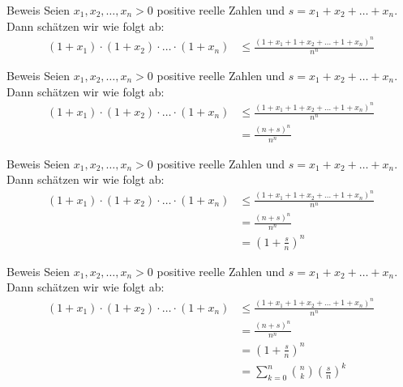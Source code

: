 \documentclass[10pt]{beamer}
\begin{document}
\begin{frame}{Beweis}
    Seien \( x_{1}, x_{2}, \ldots, x_{n} > 0 \) positive reelle Zahlen und \( s = x_{1} + x_{2} + \ldots + x_{n} \). Dann schätzen wir wie folgt ab:
    \begin{align*}
         \left( 1 + x_{1} \right) \cdot \left( 1 + x_{2} \right) \cdot \ldots \cdot \left( 1 + x_{n} \right)
         & \leq \frac{\left( 1 + x_{1} + 1 + x_{2} + \ldots + 1 + x_{n} \right)^{n}}{n^{n}}
    \end{align*}
\end{frame}



\begin{frame}{Beweis}
    Seien \( x_{1}, x_{2}, \ldots, x_{n} > 0 \) positive reelle Zahlen und \( s = x_{1} + x_{2} + \ldots + x_{n} \). Dann schätzen wir wie folgt ab:
    \begin{align*}
         \left( 1 + x_{1} \right) \cdot \left( 1 + x_{2} \right) \cdot \ldots \cdot \left( 1 + x_{n} \right)
         & \leq \frac{\left( 1 + x_{1} + 1 + x_{2} + \ldots + 1 + x_{n} \right)^{n}}{n^{n}} \\
         & = \frac{\left( n + s \right)^{n}}{n^{n}}
    \end{align*}
\end{frame}



\begin{frame}{Beweis}
    Seien \( x_{1}, x_{2}, \ldots, x_{n} > 0 \) positive reelle Zahlen und \( s = x_{1} + x_{2} + \ldots + x_{n} \). Dann schätzen wir wie folgt ab:
    \begin{align*}
         \left( 1 + x_{1} \right) \cdot \left( 1 + x_{2} \right) \cdot \ldots \cdot \left( 1 + x_{n} \right)
         & \leq \frac{\left( 1 + x_{1} + 1 + x_{2} + \ldots + 1 + x_{n} \right)^{n}}{n^{n}} \\
         & = \frac{\left( n + s \right)^{n}}{n^{n}} \\
         & = \left( 1 + \frac{s}{n} \right)^{n}
    \end{align*}
\end{frame}



\begin{frame}{Beweis}
    Seien \( x_{1}, x_{2}, \ldots, x_{n} > 0 \) positive reelle Zahlen und \( s = x_{1} + x_{2} + \ldots + x_{n} \). Dann schätzen wir wie folgt ab:
    \begin{align*}
         \left( 1 + x_{1} \right) \cdot \left( 1 + x_{2} \right) \cdot \ldots \cdot \left( 1 + x_{n} \right)
         & \leq \frac{\left( 1 + x_{1} + 1 + x_{2} + \ldots + 1 + x_{n} \right)^{n}}{n^{n}} \\
         & = \frac{\left( n + s \right)^{n}}{n^{n}} \\
         & = \left( 1 + \frac{s}{n} \right)^{n} \\
         & = \sum_{k = 0}^{n} \binom{n}{k}\left( \frac{s}{n} \right)^{k}
    \end{align*}
\end{frame}
\end{document}

